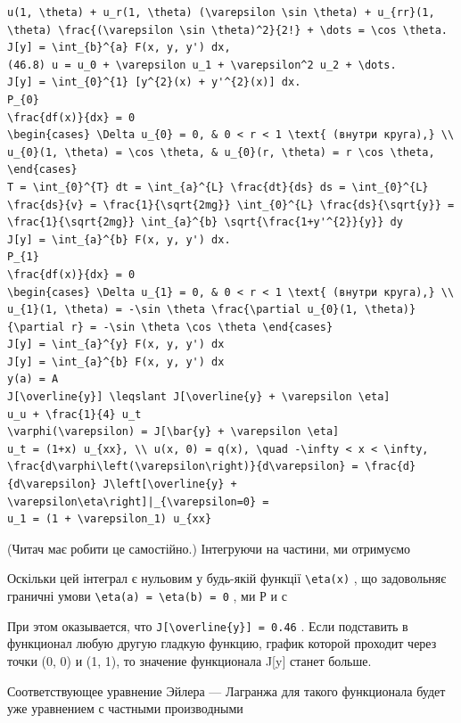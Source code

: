 \documentclass[
  ukrainian,
]{article}
\begin{document}
\begin{verbatim}
u(1, \theta) + u_r(1, \theta) (\varepsilon \sin \theta) + u_{rr}(1, \theta) \frac{(\varepsilon \sin \theta)^2}{2!} + \dots = \cos \theta.
J[y] = \int_{b}^{a} F(x, y, y') dx,
(46.8) u = u_0 + \varepsilon u_1 + \varepsilon^2 u_2 + \dots.
J[y] = \int_{0}^{1} [y^{2}(x) + y'^{2}(x)] dx.
P_{0}
\frac{df(x)}{dx} = 0
\begin{cases} \Delta u_{0} = 0, & 0 < r < 1 \text{ (внутри круга),} \\ u_{0}(1, \theta) = \cos \theta, & u_{0}(r, \theta) = r \cos \theta, \end{cases}
T = \int_{0}^{T} dt = \int_{a}^{L} \frac{dt}{ds} ds = \int_{0}^{L} \frac{ds}{v} = \frac{1}{\sqrt{2mg}} \int_{0}^{L} \frac{ds}{\sqrt{y}} = \frac{1}{\sqrt{2mg}} \int_{a}^{b} \sqrt{\frac{1+y'^{2}}{y}} dy
J[y] = \int_{a}^{b} F(x, y, y') dx.
P_{1}
\frac{df(x)}{dx} = 0
\begin{cases} \Delta u_{1} = 0, & 0 < r < 1 \text{ (внутри круга),} \\ u_{1}(1, \theta) = -\sin \theta \frac{\partial u_{0}(1, \theta)}{\partial r} = -\sin \theta \cos \theta \end{cases}
J[y] = \int_{a}^{y} F(x, y, y') dx
J[y] = \int_{a}^{b} F(x, y, y') dx
y(a) = A
J[\overline{y}] \leqslant J[\overline{y} + \varepsilon \eta]
u_u + \frac{1}{4} u_t
\varphi(\varepsilon) = J[\bar{y} + \varepsilon \eta]
u_t = (1+x) u_{xx}, \\ u(x, 0) = q(x), \quad -\infty < x < \infty,
\frac{d\varphi\left(\varepsilon\right)}{d\varepsilon} = \frac{d}{d\varepsilon} J\left[\overline{y} + \varepsilon\eta\right]|_{\varepsilon=0} =
u_1 = (1 + \varepsilon_1) u_{xx}
\end{verbatim}

(Читач має робити це самостійно.) Інтегруючи на частини, ми отримуємо

Оскільки цей інтеграл є нульовим у будь-якій функції
\texttt{\textbackslash{}eta(x)} , що задовольняє граничні умови
\texttt{\textbackslash{}eta(a)\ =\ \textbackslash{}eta(b)\ =\ 0} , ми Р
и с

При этом оказывается, что
\texttt{J{[}\textbackslash{}overline\{y\}{]}\ =\ 0.46} . Если подставить
в функционал любую другую гладкую функцию, график которой проходит через
точки (0, 0) и (1, 1), то значение функционала J{[}y{]} станет больше.

Соответствующее уравнение Эйлера --- Лагранжа для такого функционала
будет уже уравнением с частными производными
\end{document}
